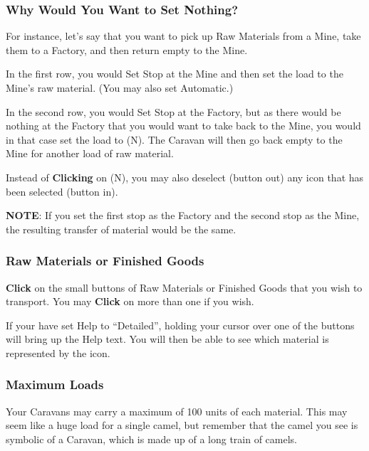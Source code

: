 \subsubsection{\textsf{Why Would You Want to Set Nothing?}}


For instance, let’s say that you want to pick up Raw Materials from a Mine, take them to a Factory, and then return empty to the Mine.


\begin{changemargin}{.5cm}{0cm}
In the first row, you would Set Stop at the Mine and then set the load to the Mine’s raw material. (You may also set Automatic.)

In the second row, you would Set Stop at the Factory, but as there would be nothing at the Factory that you would want to take back to the Mine, you would in that case set the load to (N). The Caravan will then go back empty to the Mine for another load of raw material.


Instead of \textbf{Clicking} on (N), you may also deselect (button out) any icon that has been selected (button in).
\end{changemargin}

\textbf{NOTE}: If you set the first stop as the Factory and the second stop as the Mine, the resulting transfer of material would be the same.

\subsubsection{\textsf{Raw Materials or Finished Goods}}

\textbf{Click} on the small buttons of Raw Materials or Finished Goods that you wish to transport. You may \textbf{Click} on more than one if you wish.


If your have set Help to “Detailed”, holding your cursor over one of the buttons will bring up the Help text. You will then be able to see which material is represented by the icon.

\subsubsection{\textsf{Maximum Loads}}

Your Caravans may carry a maximum of 100 units of each material. This may seem like a huge load for a single camel, but remember that the camel you see is symbolic of a Caravan, which is made up of a long train of camels.

